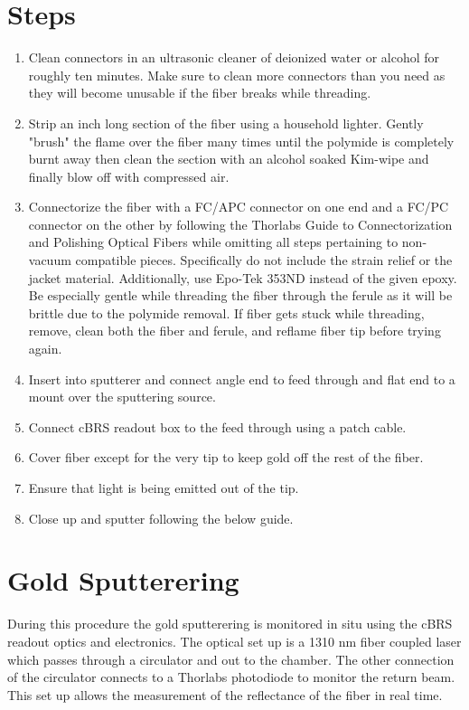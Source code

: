 \documentclass{article}
\begin{document}
\section{Steps}
\begin{enumerate}
\item Clean connectors in an ultrasonic cleaner of deionized water or alcohol for roughly ten minutes. Make sure to clean more connectors than you need as they will become unusable if the fiber breaks while threading. 
\item Strip an inch long section of the fiber using a household lighter. Gently "brush" the flame over the fiber many times until the polymide is completely burnt away then clean the section with an alcohol soaked Kim-wipe and finally blow off with compressed air.
\item Connectorize the fiber with a FC/APC connector on one end and a FC/PC connector on the other by following the Thorlabs Guide to Connectorization and Polishing Optical Fibers while omitting all steps pertaining to non-vacuum compatible pieces. Specifically do not include the strain relief or the jacket material. Additionally, use Epo-Tek 353ND instead of the given epoxy. Be especially gentle while threading the fiber through the ferule as it will be brittle due to the polymide removal. If fiber gets stuck while threading, remove, clean both the fiber and ferule, and reflame fiber tip before trying again.
\item Insert into sputterer and connect angle end to feed through and flat end to a mount over the sputtering source.
\item Connect cBRS readout box to the feed through using a patch cable.
\item Cover fiber except for the very tip to keep gold off the rest of the fiber.
\item Ensure that light is being emitted out of the tip.
\item Close up and sputter following the below guide.
\end{enumerate}
\section{Gold Sputterering}
During this procedure the gold sputterering is monitored in situ using the cBRS readout optics and electronics. The optical set up is a 1310 nm fiber coupled laser which passes through a circulator and out to the chamber. The other connection of the circulator connects to a Thorlabs photodiode to monitor the return beam. This set up allows the measurement of the reflectance of the fiber in real time.\\
\end{document}
